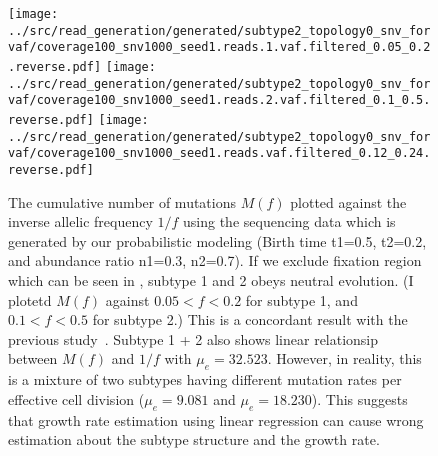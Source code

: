 \documentclass{article}
\begin{document}
\begin{figure}[H]
 \texttt{[image: ../src/read\_generation/generated/subtype2\_topology0\_snv\_forvaf/coverage100\_snv1000\_seed1.reads.1.vaf.filtered\_0.05\_0.2.reverse.pdf]}
 \texttt{[image: ../src/read\_generation/generated/subtype2\_topology0\_snv\_forvaf/coverage100\_snv1000\_seed1.reads.2.vaf.filtered\_0.1\_0.5.reverse.pdf]}
 \texttt{[image: ../src/read\_generation/generated/subtype2\_topology0\_snv\_forvaf/coverage100\_snv1000\_seed1.reads.vaf.filtered\_0.12\_0.24.reverse.pdf]}
 \caption{The cumulative number of mutations $M(f)$ plotted against the inverse allelic frequency $1/f$ using the sequencing data which is generated by our probabilistic modeling (Birth time t1=0.5, t2=0.2, and abundance ratio n1=0.3,  n2=0.7). If we exclude fixation region which can be seen in , subtype 1 and 2 obeys neutral evolution. (I plotetd $M(f)$ against $0.05 < f < 0.2$ for subtype 1, and $0.1 < f < 0.5$ for subtype 2.) This is a concordant result with the previous study~\cite{williams2016identification}. Subtype 1 + 2 also shows linear relationsip between $M(f)$ and $1/f$ with $\mu_e = 32.523$.  However, in reality, this is a mixture of two subtypes having different mutation rates per effective cell division ($\mu_e = 9.081$ and $\mu_e=18.230$). This suggests that growth rate estimation using linear regression can cause wrong estimation about the subtype structure and the growth rate.}
 \label{inverse_VAF_cumulative_generated}
\end{figure}
\end{document}
